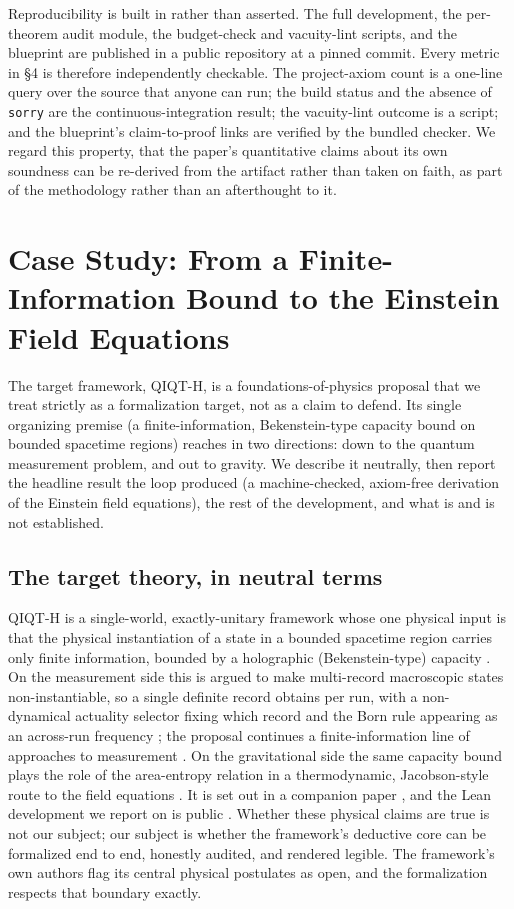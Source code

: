 \documentclass[11pt]{article}
\begin{document}
Reproducibility is built in rather than asserted. The full development, the per-theorem audit module,
the budget-check and vacuity-lint scripts, and the blueprint are published in a public repository at a
pinned commit. Every metric in \S4 is therefore independently checkable. The project-axiom count is a
one-line query over the source that anyone can run; the build status and the absence of \texttt{sorry}
are the continuous-integration result; the vacuity-lint outcome is a script; and the blueprint's
claim-to-proof links are verified by the bundled checker. We regard this property, that the paper's
quantitative claims about its own soundness can be re-derived from the artifact rather than taken on
faith, as part of the methodology rather than an afterthought to it.

\section{Case Study: From a Finite-Information Bound to the Einstein Field Equations}

The target framework, QIQT-H, is a foundations-of-physics proposal that we treat strictly as a
formalization target, not as a claim to defend. Its single organizing premise (a finite-information,
Bekenstein-type capacity bound on bounded spacetime regions) reaches in two directions: down to the
quantum measurement problem, and out to gravity. We describe it neutrally, then report the headline
result the loop produced (a machine-checked, axiom-free derivation of the Einstein field equations),
the rest of the development, and what is and is not established.

\subsection{The target theory, in neutral terms}

QIQT-H is a single-world, exactly-unitary framework whose one physical input is that the physical
instantiation of a state in a bounded spacetime region carries only finite information, bounded by a
holographic (Bekenstein-type) capacity \cite{r40}. On the measurement side this is argued to make
multi-record macroscopic states non-instantiable, so a single definite record obtains per run, with
a non-dynamical actuality selector fixing which record and the Born rule appearing as an across-run
frequency \cite{r32,r33,r34}; the proposal continues a finite-information line of approaches to
measurement \cite{r41}. On the gravitational side the same capacity bound plays the role of the
area-entropy relation in a thermodynamic, Jacobson-style route to the field equations \cite{r46}. It
is set out in a companion paper \cite{r42}, and the Lean development we report on is public
\cite{r43}. Whether these physical claims are true is not our subject; our subject is whether the
framework's deductive core can be formalized end to end, honestly audited, and rendered legible. The
framework's own authors flag its central physical postulates as open, and the formalization respects
that boundary exactly.
\end{document}
